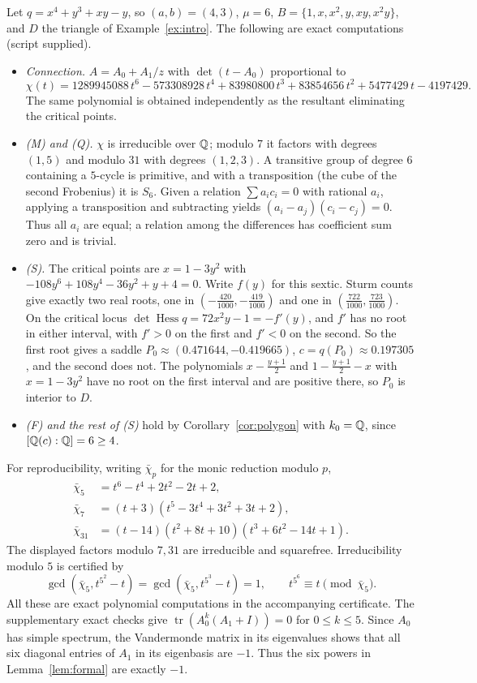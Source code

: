 \documentclass[11pt]{article}
\numberwithin{equation}{section}
\theoremstyle{definition}
\theoremstyle{remark}
\begin{document}
Let $q=x^4+y^3+xy-y$, so $(a,b)=(4,3)$, $\mu=6$,
$B=\{1,x,x^2,y,xy,x^2y\}$, and $D$ the triangle of Example~\ref{ex:intro}.
The following are exact computations (script supplied).
\begin{itemize}[leftmargin=1.6em]
\item \emph{Connection.} $A=A_0+A_1/z$ with
 $\det(t-A_0)$ proportional to
 \[
 \chi(t)=1289945088\,t^6-573308928\,t^4+83980800\,t^3+83854656\,t^2+5477429\,t-4197429.
 \]
 The same polynomial is obtained independently as the resultant eliminating
 the critical points.
\item \emph{(M) and (Q).} $\chi$ is irreducible over $\mathbb Q$; modulo $7$ it
 factors with degrees $(1,5)$ and modulo $31$ with degrees $(1,2,3)$. A
 transitive group of degree $6$ containing a $5$-cycle is primitive, and with
 a transposition (the cube of the second Frobenius) it is $S_6$. Given a
 relation $\sum a_i c_i=0$ with rational $a_i$, applying a transposition
 and subtracting yields $(a_i-a_j)(c_i-c_j)=0$. Thus all $a_i$ are equal;
 a relation among the differences has coefficient sum zero and is trivial.
\item \emph{(S).} The critical points are $x=1-3y^2$ with
 $-108y^6+108y^4-36y^2+y+4=0$. Write $f(y)$ for this sextic. Sturm counts give exactly two real roots, one in
 $(-\tfrac{420}{1000},-\tfrac{419}{1000})$ and one in
 $(\tfrac{722}{1000},\tfrac{723}{1000})$. On the critical locus
 $\det\operatorname{Hess}q=72x^2y-1=-f'(y)$, and $f'$ has no root in either
 interval, with $f'>0$ on the first and $f'<0$ on the second. So the first root
 gives a saddle $P_0\approx(0.471644,-0.419665)$, $c=q(P_0)\approx0.197305$,
 and the second does not. The polynomials $x-\tfrac{y+1}2$ and
 $1-\tfrac{y+1}2-x$ with $x=1-3y^2$ have no root on the first interval and are
 positive there, so $P_0$ is interior to $D$.
\item \emph{(F) and the rest of (S)} hold by Corollary~\ref{cor:polygon} with
 $k_0=\mathbb Q$, since $[\mathbb Q(c):\mathbb Q]=6\ge4$.
\end{itemize}
For reproducibility, writing $\bar\chi_p$ for the monic reduction modulo $p$,
\begin{align*}
 \bar\chi_5&=t^6-t^4+2t^2-2t+2,\\
 \bar\chi_7&=(t+3)(t^5-3t^4+3t^2+3t+2),\\
 \bar\chi_{31}&=(t-14)(t^2+8t+10)(t^3+6t^2-14t+1).
\end{align*}
The displayed factors modulo $7,31$ are irreducible and squarefree.
Irreducibility modulo $5$ is certified by
\[
 \gcd(\bar\chi_5,t^{5^2}-t)=\gcd(\bar\chi_5,t^{5^3}-t)=1,
 \qquad t^{5^6}\equiv t\pmod{\bar\chi_5}.
\]
All these are exact polynomial computations in the accompanying certificate.
The supplementary exact checks give
$\operatorname{tr}(A_0^k(A_1+I))=0$ for $0\le k\le5$.
Since $A_0$ has simple spectrum, the Vandermonde matrix in its eigenvalues
shows that all six diagonal entries of $A_1$ in its eigenbasis are $-1$.
Thus the six powers in Lemma~\ref{lem:formal} are exactly $-1$.
\end{document}
